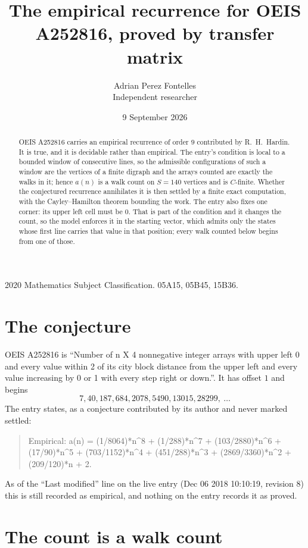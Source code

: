 \documentclass[11pt,a4paper]{article}
\title{The empirical recurrence for OEIS A252816, proved by transfer matrix}
\author{Adrian Perez Fontelles\\ \small Independent researcher}
\date{9 September 2026}
\theoremstyle{plain}
\theoremstyle{definition}
\begin{document}
\maketitle

\begin{abstract}
OEIS A252816 carries an empirical recurrence of order $9$ contributed by R.~H.~Hardin. It is
true, and it is decidable rather than empirical. The entry's condition is local to a bounded window of consecutive lines, so
the admissible configurations of such a window are the vertices of a finite digraph and the
arrays counted are exactly the walks in it; hence $a(n)$ is a walk count on $S=140$ vertices
and is $C$-finite. Whether the conjectured recurrence annihilates it is then settled by a
finite exact computation, with the Cayley--Hamilton theorem bounding the work.
 The entry also fixes one corner: its upper left cell must be $0$. That is part of the condition and it changes the count, so the model enforces it in the starting vector, which admits only the states whose first line carries that value in that position; every walk counted below begins from one of those.\end{abstract}

\noindent\small 2020 Mathematics Subject Classification. 05A15, 05B45, 15B36.\normalsize

\section{The conjecture}

OEIS A252816 is ``Number of n X 4 nonnegative integer arrays with upper left 0 and every value within 2 of its city block distance from the upper left and every value increasing by 0 or 1 with every step right or down.''. It has offset $1$ and begins
\[
7, 40, 187, 684, 2078, 5490, 13015, 28299,\ \dots
\]
The entry states, as a conjecture contributed by its author and never marked settled:
\begin{quote}
Empirical: a(n) = (1/8064)*n\^{}8 + (1/288)*n\^{}7 + (103/2880)*n\^{}6 + (17/90)*n\^{}5 + (703/1152)*n\^{}4 + (451/288)*n\^{}3 + (2869/3360)*n\^{}2 + (209/120)*n + 2.
\end{quote}
As of the ``Last modified'' line on the live entry (Dec 06 2018 10:10:19, revision 8) this is still
recorded as empirical, and nothing on the entry records it as proved.

\section{The count is a walk count}
\end{document}

